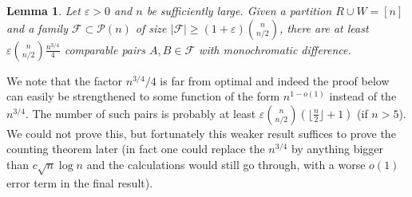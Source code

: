\documentclass[11pt]{article}
\newtheorem{lemma}[theorem]{Lemma}
\numberwithin{equation}{section}
\def\eps{\varepsilon}
\begin{document}
\begin{lemma}\label{twocolourspernersupersat}
Let $\eps>0$ and $n$ be sufficiently large. Given a partition $R\cup W=[n]$ and a family $\mathcal{F}\subset \mathcal{P}(n)$ of size $|\mathcal{F}|\geq (1+\eps)\binom{n}{n/2}$, there are at least $\eps \binom{n}{n/2}\frac{n^{3/4}}{4}$  comparable pairs
$A,B \in \mathcal F$ with monochromatic difference.
\end{lemma}
We note that the factor ${n^{3/4}}/{4}$ is far from optimal  and indeed the proof below can easily be strengthened to some function of the form $n^{1-o(1)}$ instead of the $n^{3/4}$. The number of such pairs is probably at least $\eps\binom{n}{n/2}\left(\lfloor\frac{n}{2}\rfloor +1\right)$ (if $n>5$). We could not prove this, but fortunately this weaker result suffices to prove the counting theorem later (in fact one could replace the $n^{3/4}$ by anything bigger than $c\sqrt{n}\log n$ and the calculations would still go through, with a worse $o(1)$ error term in the final result).
\end{document}
